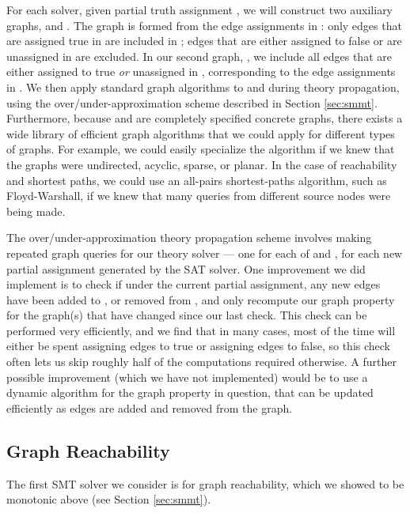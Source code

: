 \documentclass[runningheads]{llncs}
\begin{document}
For each solver, given partial truth assignment , we will construct two
auxiliary graphs,  and . The graph  is formed
from the edge assignments in : only edges that are assigned true in
 are included in ; edges that are either assigned to false
or are unassigned in  are excluded. In our second graph, , we
include all edges that are either assigned to true \textit{or} unassigned
in , corresponding to the edge assignments in . We then
apply standard graph algorithms
to  and  during theory propagation, using the
over/under-approximation scheme described in Section \ref{sec:smmt}.
Furthermore, because  and  are completely specified
concrete graphs,
there exists a wide library of efficient graph algorithms that we could
apply for different types of graphs.
For example, we could
easily specialize the algorithm if we knew that the graphs were
undirected, acyclic, sparse, or planar. In the case of reachability
and shortest paths, we could use an all-pairs shortest-paths algorithm,
such as Floyd-Warshall, if we knew that many queries from different
source nodes were being made.

The over/under-approximation theory propagation scheme involves making
repeated graph queries for our theory solver --- one for each of 
and , for each new partial assignment generated by the SAT
solver. One improvement we did implement is to check if under the
current partial assignment, any new edges have been added to ,
or removed from , and only recompute our graph property for
the graph(s) that have changed since our last check.  This check can
be performed very efficiently, and we find that in many cases, most
of the time will either be spent assigning edges to true or assigning
edges to false, so this check often lets us skip roughly half of the
computations required otherwise. A further possible improvement (which
we have not implemented) would be to use a dynamic algorithm for the
graph property in question, that can be updated efficiently as edges
are added and removed from the graph.






\subsection{{Graph Reachability}}
The first SMT solver we consider is for graph reachability, which we showed to be monotonic above (see Section \ref{sec:smmt}).
\end{document}
